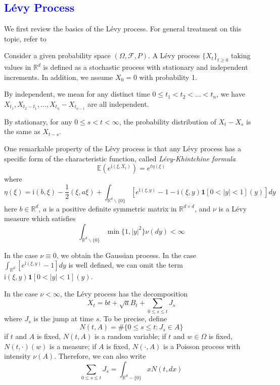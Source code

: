 \documentclass[3p,,preprint,12pt]{elsarticle}
\newcommand{\ii}[0]{\mathrm{i}}
\newcommand{\RR}[0]{\mathbb{R}}
\newcommand{\lib}[1]{\textcolor{blue}{\section{#1}}}
\theoremstyle{definition}
\begin{document}
\lib{L\'evy Process}
We first review the basics of the L\'evy process. For general treatment on this topic, refer to \cite{doney2007introduction,papapantoleon2008introduction,sato1999levy}

Consider a given probability space $(\Omega, \mathcal{F}, P)$. A L\'evy process $\{X_t\}_{t\geq 0}$ taking values in $\RR^d$ is defined as a stochastic process with stationary and independent increments. In addition, we assume $X_0=0$ with probability 1. 

By independent, we mean for any distinct time $0\leq t_1<t_2<\ldots<t_n$, we have $X_{t_1}, X_{t_2-t_1}, \ldots, X_{t_n}-X_{t_{n-1}}$ are all independent. 

By stationary,  for any $0\leq s < t <\infty$, the probability distribution of $X_t-X_s$ is the same as $X_{t-s}$.

One remarkable property of the L\'evy process is that any L\'evy process has a specific form of the characteristic function, called \textit{L\'evy-Khintchine formula}
\begin{equation}
	\mathbb{E}(e^{\ii (\xi, X_t)}) = e^{t\eta(\xi)}
\end{equation}
where
\begin{equation}\label{equ:eta}
	\eta(\xi) = \ii (b, \xi) - \frac{1}{2}(\xi, a\xi) + \int_{\RR^d\backslash \{0\}} \left[ e^{\ii (\xi, y)}-1-\ii (\xi, y)\mathbf{1}[0<|y|<1](y) \right]dy
\end{equation}
here $b\in \RR^d$, $a$ is a positive definite symmetric matrix in $\RR^{d\times d}$, and $\nu$ is a L\'evy measure which satisfies
\begin{equation}
	\int_{\RR^d\backslash \{0\}} \min\{1, |y|^2\}\nu(dy)<\infty
\end{equation}

In the case $\nu\equiv 0$, we obtain the Gaussian process. In the case $\int_{\RR^d} \left[ e^{\ii (\xi, y)}-1\right]dy$ is well defined, we can omit the term $\ii (\xi, y)\mathbf{1}[0<|y|<1](y)$. 

In the case $\nu<\infty$, the L\'evy process has the decomposition
\begin{equation}
	X_t = bt + \sqrt{a}B_t + \sum_{0\leq s\leq t} J_s 
\end{equation}
where $J_s$ is the jump at time $s$. To be precise, define 
\begin{equation}
	N(t, A) = \#\{0\leq s\leq t: J_s\in A\}
\end{equation}
if $t$ and $A$ is fixed, $N(t, A)$ is a random variable; if $t$ and $w\in \Omega$ is fixed, $N(t, \cdot)(w)$ is a measure; if $A$ is fixed, $N(\cdot, A)$ is a Poisson process with intensity $\nu(A)$. Therefore, we can also write
\begin{equation}
	\sum_{0\leq s\leq t} J_s = \int_{\RR^d-\{0\}} xN(t, dx)
\end{equation}
\end{document}
